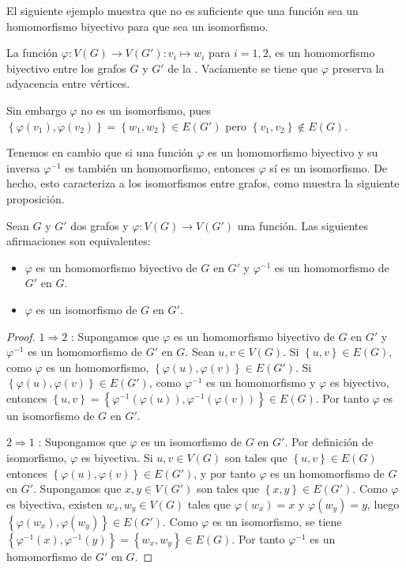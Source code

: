 El siguiente ejemplo muestra que no es suficiente que una función sea un homomorfismo biyectivo para que sea un isomorfismo.
\begin{Ejm}
   La función $\varphi:V(G)\to V(G'):v_i\mapsto w_i$ para $i=1,2$, es un homomorfismo biyectivo entre los grafos $G$ y $G'$ de la . Vacíamente se tiene que $\varphi$ preserva la adyacencia entre vértices.
   
   Sin embargo $\varphi$ no es un isomorfismo, pues $\left\lbrace \varphi(v_1),\varphi(v_2)\right\rbrace=\left\lbrace w_1,w_2\right\rbrace\in E(G')$ pero $\left\lbrace v_1,v_2\right\rbrace\notin E(G)$.
\end{Ejm}
Tenemos en cambio que si una función $\varphi$ es un homomorfismo biyectivo y su inversa $\varphi^{-1}$ es también un homomorfismo, entonces $\varphi$ sí es un isomorfismo. De hecho, esto caracteriza a los isomorfismos entre grafos, como muestra la siguiente proposición.\clearpage
\begin{Prop}
   Sean $G$ y $G'$ dos grafos y $\varphi:V(G)\to V(G')$ una función. Las siguientes afirmaciones son equivalentes:
   \begin{itemize}
      \item[1.] $\varphi$ es un homomorfismo biyectivo de $G$ en $G'$ y $\varphi^{-1}$ es un homomorfismo de $G'$ en $G$.
      \item[2.] $\varphi$ es un isomorfismo de $G$ en $G'$.
   \end{itemize}
\end{Prop}
\begin{proof}
   $1\Rightarrow 2$ : Supongamos que $\varphi$ es un homomorfismo biyectivo de $G$ en $G'$ y $\varphi^{-1}$ es un homomorfismo de $G'$ en $G$. Sean $u,v \in V(G)$. Si $\left\lbrace u,v\right\rbrace\in E(G)$, como $\varphi$ es un homomorfismo, $\left\lbrace \varphi(u),\varphi(v)\right\rbrace\in E(G')$. Si $\left\lbrace \varphi(u),\varphi(v)\right\rbrace\in E(G')$, como $\varphi^{-1}$ es un homomorfismo y $\varphi$ es biyectivo, entonces $\left\lbrace u,v\right\rbrace=\left\lbrace \varphi^{-1}(\varphi(u)),\varphi^{-1}(\varphi(v))\right\rbrace\in E(G)$. Por tanto $\varphi$ es un isomorfismo de $G$ en $G'$.\par
   $2\Rightarrow 1$ : Supongamos que $\varphi$ es un isomorfismo de $G$ en $G'$. Por definición de isomorfismo, $\varphi$ es biyectiva. Si $u,v\in V(G)$ son tales que $\left\lbrace u,v\right\rbrace\in E(G)$ entonces $\left\lbrace \varphi(u),\varphi(v)\right\rbrace\in E(G')$, y por tanto $\varphi$ es un homomorfismo de $G$ en $G'$. Supongamos que $x,y\in V(G')$ son tales que $\left\lbrace x,y\right\rbrace\in E(G')$. Como $\varphi$ es biyectiva, existen $w_x,w_y\in V(G)$ tales que $\varphi(w_x)=x$ y $\varphi(w_y)=y$, luego $\left\lbrace \varphi(w_x),\varphi(w_y)\right\rbrace\in E(G')$. Como $\varphi$ es un isomorfismo, se tiene $\left\lbrace \varphi^{-1}(x),\varphi^{-1}(y)\right\rbrace=\left\lbrace w_x,w_y\right\rbrace\in E(G)$. Por tanto $\varphi^{-1}$ es un homomorfismo de $G'$ en $G$.
\end{proof}
